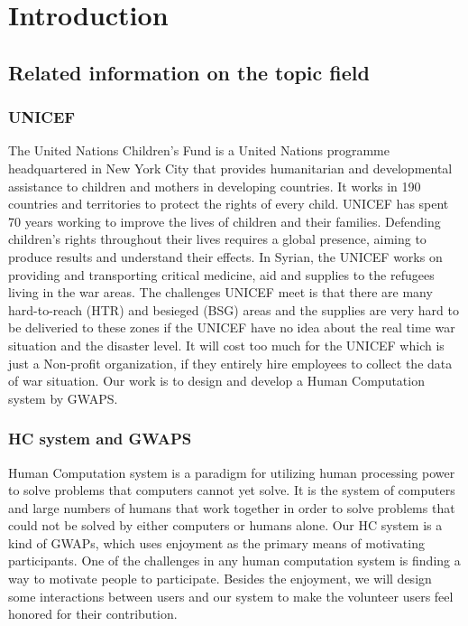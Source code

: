 \section{Introduction}

\subsection{Related information on the topic field}

\subsubsection{UNICEF}
  The United Nations Children's Fund\cite{unicef1994state} is a United Nations programme headquartered
  in New York City that provides humanitarian and developmental assistance to 
  children and mothers in developing countries. 
  It works in 190 countries and territories to protect the rights of every child. 
  UNICEF has spent 70 years working to improve the lives of children and their families. 
  Defending children's rights throughout their lives requires a global presence, 
  aiming to produce results and understand their effects. 
  In Syrian, the UNICEF works on providing and transporting critical medicine, 
  aid and supplies to the refugees living in the war areas. The challenges UNICEF meet is that 
  there are many hard-to-reach (HTR) and besieged (BSG) areas and the supplies are 
  very hard to be deliveried to these zones if the UNICEF have no idea about 
  the real time war situation and the disaster level. It will cost too much for the UNICEF 
  which is just a Non-profit organization, if they entirely hire employees to 
  collect the data of war situation. 
  Our work is to design and develop a Human Computation system by GWAPS\cite{lafourcade2015games}.

  \subsubsection{HC system and GWAPS}
  Human Computation system is a paradigm for utilizing human processing power to solve problems that 
  computers cannot yet solve\cite{quinn2011human}. 
  It is the system of computers and large numbers of humans that work together in order to solve problems that 
  could not be solved by either computers or humans alone\cite{quinn2009taxonomy}.
  Our HC system is a kind of GWAPs, which uses enjoyment as the primary means of motivating participants. 
  One of the challenges in any human computation system is finding a way to motivate people 
  to participate\cite{quinn2011human}. 
  Besides the enjoyment, we will design some interactions between users and our system to 
  make the volunteer users feel honored for their contribution.

